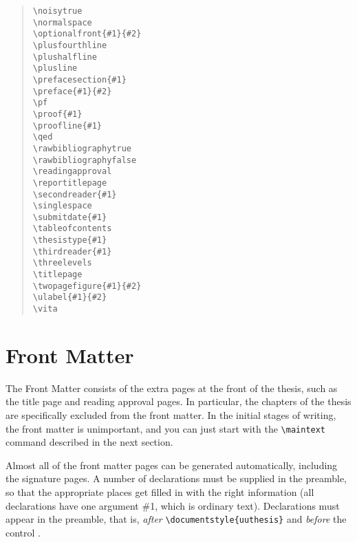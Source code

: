 \begin{quote}
\verb|\noisytrue| \\
\verb|\normalspace| \\
\verb|\optionalfront{#1}{#2}| \\
\verb|\plusfourthline| \\
\verb|\plushalfline| \\
\verb|\plusline| \\
\verb|\prefacesection{#1}| \\
\verb|\preface{#1}{#2}| \\
\verb|\pf|\\
\verb|\proof{#1}|\\
\verb|\proofline{#1}|\\
\verb|\qed| \\
\verb|\rawbibliographytrue| \\
\verb|\rawbibliographyfalse| \\
\verb|\readingapproval| \\
\verb|\reportitlepage| \\
\verb|\secondreader{#1}| \\
\verb|\singlespace| \\
\verb|\submitdate{#1}| \\
\verb|\tableofcontents| \\
\verb|\thesistype{#1}| \\
\verb|\thirdreader{#1}| \\
\verb|\threelevels| \\
\verb|\titlepage| \\
\verb|\twopagefigure{#1}{#2}| \\
\verb|\ulabel{#1}{#2}|\\
\verb|\vita|
\end{quote}

\section{Front Matter}

\noindent The Front Matter consists of the extra pages at the front of
the thesis, such as the title page and reading approval pages. In
particular, the chapters of the thesis are specifically excluded from
the front matter. In the initial stages of writing, the front matter is
unimportant, and you can just start with the \verb|\maintext| command
described in the next section.

Almost all of the front matter pages can be generated automatically,
including the signature pages. A number of declarations must be supplied
in the preamble, so that the appropriate places get filled in with the
right information (all declarations have one argument \#1, which is
ordinary text). Declarations must appear in the preamble, that is, {\em
after} \verb|\documentstyle{uuthesis}| and {\em before} the control
\verb||.

